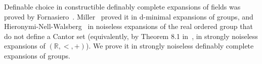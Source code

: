 \documentclass[12pt]{article}
\newcommand{\R}{\mathbb{R}}
\theoremstyle{definition}
\theoremstyle{remark}
\begin{document}
Definable choice in constructible definably complete expansions of fields was proved by Fornasiero~\cite[Section 4]{for21}. Miller~\cite{miller06-choice} proved it in d-minimal expansions of groups, and Hieronymi-Nell-Walsberg~\cite{HieNelWal18} in noiseless expansions of the real ordered group that do not define a Cantor set (equivalently, by Theorem 8.1 in~\cite{Wal22}, in strongly noiseless expansions of $(\R,<,+)$). We prove it in strongly noiseless definably complete expansions of groups. 


\end{document}

